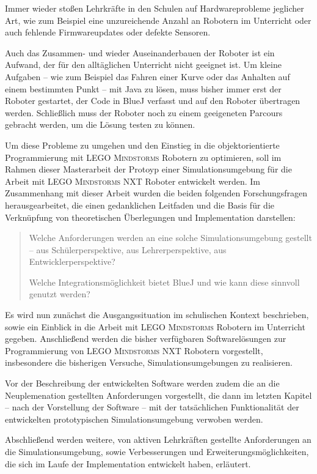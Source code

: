 \documentclass[paper=a4, DIV=calc, BCOR=12mm, twoside=on, onecolumn=on, open = right, titlepage =on, parskip =half-, headsepline = on, footsepline = off, chapterprefix = off, appendixprefix = on, fontsize = 12pt, numbers = noenddot, abstract = on]{scrbook}
\begin{document}
Immer wieder stoßen Lehrkräfte in den Schulen auf Hardwareprobleme jeglicher Art, wie zum Beispiel eine unzureichende Anzahl an Robotern im Unterricht oder auch fehlende Firmwareupdates oder defekte Sensoren.

Auch das Zusammen- und wieder Auseinanderbauen der Roboter ist ein Aufwand, der für den alltäglichen Unterricht nicht geeignet ist. Um kleine Aufgaben -- wie zum Beispiel das Fahren einer Kurve oder das Anhalten auf einem bestimmten Punkt -- mit Java zu lösen, muss bisher immer erst der Roboter gestartet, der Code in BlueJ verfasst und auf den Roboter übertragen werden. Schließlich muss der Roboter noch zu einem geeigeneten Parcours gebracht werden, um die Lösung testen zu können.

Um diese Probleme zu umgehen und den Einstieg in die objektorientierte Programmierung mit \textsc{LEGO Mindstorms} Robotern zu optimieren, soll im Rahmen dieser Masterarbeit der Protoyp einer Simulationsumgebung für die Arbeit mit \textsc{LEGO Mindstorms} NXT Roboter entwickelt werden. Im Zusammenhang mit dieser Arbeit wurden die beiden folgenden Forschungsfragen herausgearbeitet, die einen gedanklichen Leitfaden und die Basis für die Verknüpfung von theoretischen Überlegungen und Implementation darstellen:
\begin{quote}
Welche Anforderungen werden an eine solche Simulationsumgebung gestellt -- aus Schülerperspektive, aus Lehrerperspektive, aus Entwicklerperspektive?

Welche Integrationsmöglichkeit bietet BlueJ und wie kann diese sinnvoll genutzt werden?
\end{quote}

Es wird nun zunächst die Ausgangssituation im schulischen Kontext beschrieben, sowie ein Einblick in die Arbeit mit \textsc{LEGO Mindstorms} Robotern im Unterricht gegeben. Anschließend werden die bisher verfügbaren Softwarelösungen zur Programmierung von \textsc{LEGO Mindstorms} NXT Robotern vorgestellt, insbesondere die bisherigen Versuche, Simulationsumgebungen zu realisieren.

Vor der Beschreibung der entwickelten Software werden zudem die an die Neuplemenation gestellten Anforderungen vorgestellt, die dann im letzten Kapitel -- nach der Vorstellung der Software -- mit der tatsächlichen Funktionalität der entwickelten prototypischen Simulationsumgebung verwoben werden.

Abschließend werden weitere, von aktiven Lehrkräften gestellte Anforderungen an die Simulationsumgebung, sowie Verbesserungen und Erweiterungsmöglichkeiten, die sich im Laufe der Implementation entwickelt haben, erläutert.
\newpage
\par\singlespacing
\end{document}
